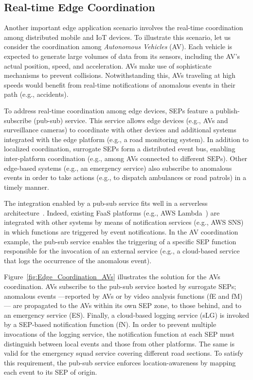 
\subsection{Real-time Edge Coordination}\label{sec:SEP_RTEC}


Another important edge application scenario involves the real-time coordination among distributed mobile and IoT devices. %
To illustrate this scenario, let us consider the coordination among \textit{Autonomous Vehicles} (AV). Each vehicle is expected to generate large volumes of data from its sensors, including the AV's actual position, speed, and acceleration. AVs make use of sophisticate mechanisms to prevent collisions. Notwithstanding this, AVs traveling at high speeds would benefit from real-time notifications of anomalous events in their path (e.g., accidents). 

To address real-time coordination among edge devices, SEPs feature a publish-subscribe (pub-sub) service. This service allows edge devices (e.g., AVs and surveillance cameras) to coordinate with other devices and additional systems integrated with the edge platform (e.g., a road monitoring system). In addition to localized coordination, surrogate SEPs form a distributed event bus, enabling inter-platform coordination (e.g., among AVs connected to different SEPs). Other edge-based systems (e.g., an emergency service) also subscribe to anomalous events in order to take actions (e.g., to dispatch ambulances or road patrols) in a timely manner.

The integration enabled by a pub-sub service fits well in a serverless architecture~\cite{Lloyd18serverless}. Indeed, existing FaaS platforms (e.g., AWS Lambda~\cite{AWSLambda}) are integrated with other systems by means of notification services (e.g., AWS SNS) in which functions are triggered by event notifications. In the AV coordination example, the pub-sub service 
enables the triggering of a specific SEP function responsible for the invocation of an external service (e.g., a cloud-based service that logs the occurrence of the anomalous event). 

Figure~\ref{fig:Edge_Coordination_AVs} illustrates the solution for the AVs coordination. AVs subscribe to the pub-sub service hosted by surrogate SEPs; anomalous events ---reported by AVs or by video analysis functions (fE and fM) --- are propagated to the AVs within its own SEP zone, to those behind, and to an emergency service (ES). Finally, a cloud-based logging service (sLG) is invoked by a SEP-based notification function (fN). In order to prevent multiple invocations of the logging service, the notification function at each SEP must distinguish between local events and those from other platforms. The same is valid for the emergency squad service covering different road sections. To satisfy this requirement, the pub-sub service enforces location-awareness by mapping each event to its SEP of origin.

